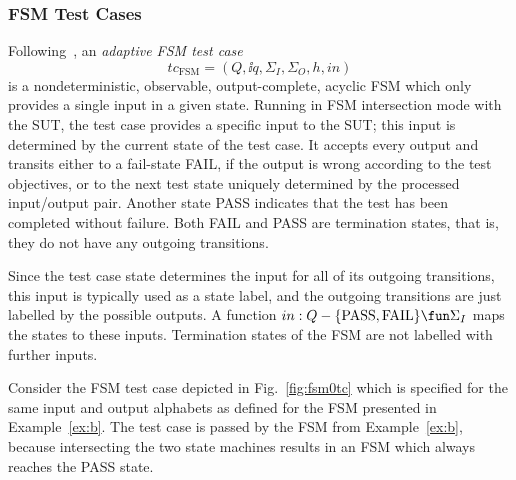 \subsubsection*{FSM Test Cases}

Following~\cite{DBLP:conf/hase/PetrenkoY14}, 
an \emph{adaptive FSM test case} 
$$
tc_\text{FSM}=(Q,\ii q,\Sigma_I,\Sigma_O,h,in)
$$ 
is a nondeterministic, observable, output-complete, acyclic FSM which only provides a single input in a given state. Running in FSM intersection mode with the SUT, the test case provides a specific input to the SUT; this input is determined by the current state of the test case. It accepts every output and transits either to a fail-state FAIL, if the output is wrong according to the test objectives, or to the next test state uniquely determined  by the processed input/output pair. Another state PASS indicates that
the test has been completed without failure. Both FAIL and PASS are termination states, that is, they do not have any outgoing transitions.

Since the test case state determines the input for all of its outgoing transitions, this input is typically used as a state label, and the outgoing transitions are just labelled by the possible outputs. A function $in : Q -\{  \text{PASS}, \text{FAIL} \} 
\fun\Sigma_I$ maps the states to these inputs. Termination states
of the FSM are not labelled with further inputs.

\begin{example}
Consider the FSM test case depicted in Fig.~\ref{fig:fsm0tc} which is specified
for the same input and output alphabets as defined for  the FSM presented in Example~\ref{ex:b}. The test case is passed by the FSM from Example~\ref{ex:b}, because 
intersecting the two state machines results in an FSM which always reaches the PASS state.
\xbox
\end{example}


